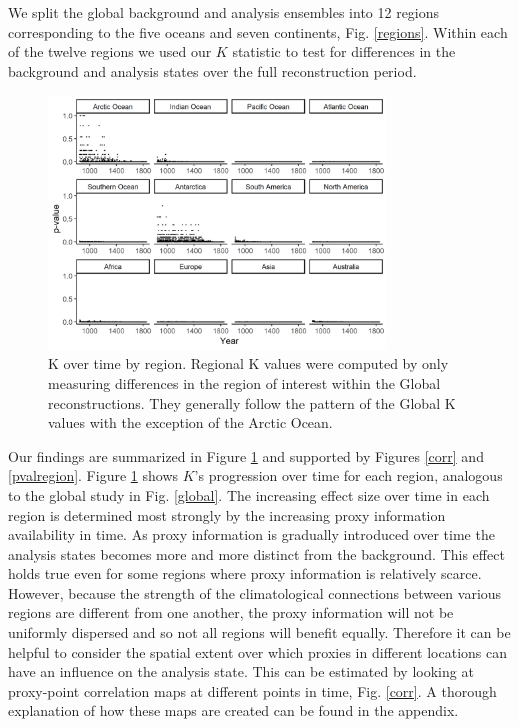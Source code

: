 \documentclass[12pt]{article}
\begin{document}
We split the global background and analysis ensembles into 12 regions corresponding to the five oceans and seven continents, Fig. \ref{regions}. Within each of the twelve regions we used our $K$ statistic to test for differences in the background and analysis states over the full reconstruction period. 
\begin{figure}
	\begin{center}
    \includegraphics[width=0.80\textwidth,valign=c]{results/k_region.png}
    \caption{K over time by region. Regional K values were computed by only measuring differences in the region of interest within the Global reconstructions. They generally follow the pattern of the Global K values with the exception of the Arctic Ocean.}
    \label{kregion}
    \end{center}
\end{figure}
Our findings are summarized in Figure \ref{kregion} and supported by Figures \ref{corr} and \ref{pvalregion}. Figure \ref{kregion} shows $K$'s progression over time for each region, analogous to the global study in Fig. \ref{global}. The increasing effect size over time in each region is determined most strongly by the increasing proxy information availability in time. As proxy information is gradually introduced over time the analysis states becomes more and more distinct from the background. This effect holds true even for some regions where proxy information is relatively scarce. However, because the strength of the climatological connections between various regions are different from one another, the proxy information will not be uniformly dispersed and so not all regions will benefit equally. Therefore it can be helpful to consider the spatial extent over which proxies in different locations can have an influence on the analysis state. This can be estimated by looking at proxy-point correlation maps at different points in time, Fig. \ref{corr}. A thorough explanation of how these maps are created can be found in the appendix.
\end{document}
